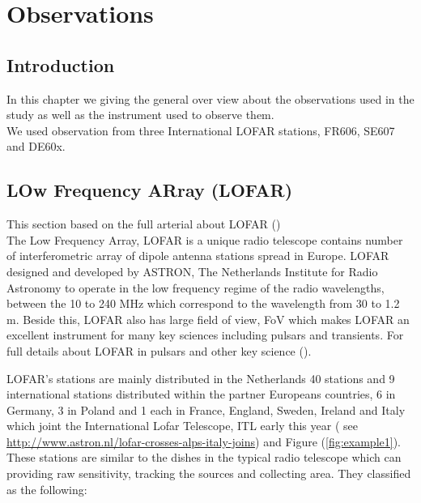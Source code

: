 
\chapter{Observations} %

\label{Chapter3} %


\section{ Introduction}

In this chapter we giving the general over view about the observations used in the study as well as the instrument used to observe them.\\

We used observation from three International LOFAR stations, FR606, SE607 and DE60x. 

\section{LOw Frequency ARray (LOFAR)}
This section based on the full arterial about LOFAR (\citet{van2013lofar})\\

The Low Frequency Array, LOFAR is a unique radio telescope contains number of interferometric array of dipole antenna stations spread in Europe. LOFAR designed and developed by ASTRON, The Netherlands Institute for Radio Astronomy to operate in the low frequency regime of the radio wavelengths, between the 10 to 240 MHz which correspond to the wavelength from 30 to 1.2 m. Beside this, LOFAR also has large field of view, FoV which makes LOFAR an excellent instrument for many key sciences including pulsars and transients. For full details about LOFAR in pulsars and other key science (\citet{ stappers2011observing}). 

LOFAR's stations are mainly distributed in the Netherlands 40 stations and 9 international stations distributed within the partner Europeans countries, 6 in Germany, 3 in Poland and 1 each in France, England, Sweden, Ireland and Italy which joint the International Lofar Telescope, ITL early this year ( see \url{http://www.astron.nl/lofar-crosses-alps-italy-joins}) and Figure (\ref{fig:example1}). These stations are similar to the dishes in the typical radio telescope which can providing raw sensitivity, tracking the sources and collecting area. They classified as the following:


